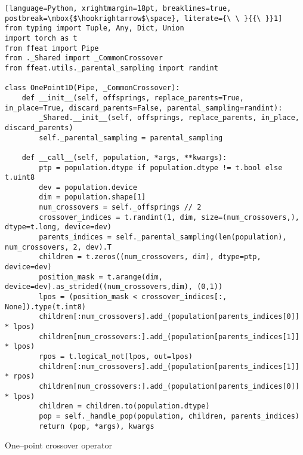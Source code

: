 \begin{algorithm}
\begin{lstlisting}[language=Python, xrightmargin=18pt, breaklines=true, postbreak=\mbox{$\hookrightarrow$\space}, literate={\ \ }{{\ }}1]
from typing import Tuple, Any, Dict, Union
import torch as t
from ffeat import Pipe
from ._Shared import _CommonCrossover
from ffeat.utils._parental_sampling import randint

class OnePoint1D(Pipe, _CommonCrossover):
    def __init__(self, offsprings, replace_parents=True, in_place=True, discard_parents=False, parental_sampling=randint):
        _Shared.__init__(self, offsprings, replace_parents, in_place, discard_parents)
        self._parental_sampling = parental_sampling

    def __call__(self, population, *args, **kwargs):
        ptp = population.dtype if population.dtype != t.bool else t.uint8
        dev = population.device
        dim = population.shape[1]
        num_crossovers = self._offsprings // 2
        crossover_indices = t.randint(1, dim, size=(num_crossovers,), dtype=t.long, device=dev)
        parents_indices = self._parental_sampling(len(population), num_crossovers, 2, dev).T
        children = t.zeros((num_crossovers, dim), dtype=ptp, device=dev)
        position_mask = t.arange(dim, device=dev).as_strided((num_crossovers,dim), (0,1))
        lpos = (position_mask < crossover_indices[:, None]).type(t.int8)
        children[:num_crossovers].add_(population[parents_indices[0]] * lpos)
        children[num_crossovers:].add_(population[parents_indices[1]] * lpos)
        rpos = t.logical_not(lpos, out=lpos)
        children[:num_crossovers].add_(population[parents_indices[1]] * rpos)
        children[num_crossovers:].add_(population[parents_indices[0]] * lpos)
        children = children.to(population.dtype)
        pop = self._handle_pop(population, children, parents_indices)
        return (pop, *args), kwargs
\end{lstlisting}
\caption{One--point crossover operator}
\label{alg:implonepoint}
\end{algorithm}

